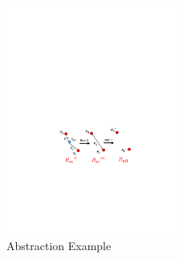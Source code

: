 \begin{figure}[!t]
	\centering
	\includegraphics[width=0.5\textwidth]{figs/abs_sim.pdf}
	\caption{\small Abstraction Example}
	\label{fig:abs_exam}
\end{figure}

